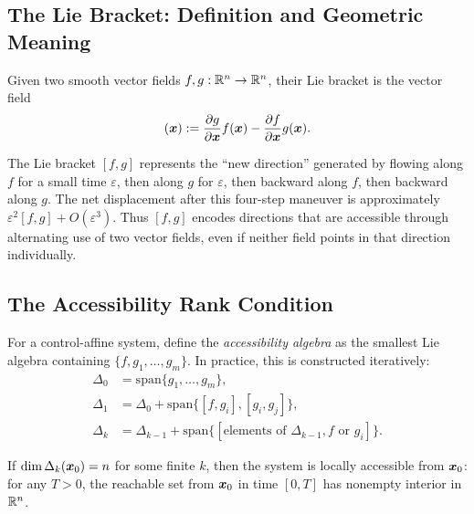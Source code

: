 \subsection{The Lie Bracket: Definition and Geometric Meaning}

\begin{definition}
\label{def:ch3:lie-bracket}
Given two smooth vector fields $f, g: \mathbb{R}^n \to \mathbb{R}^n$, their Lie bracket is the vector field
\begin{equation}
[f, g](\x) := \frac{\partial g}{\partial \x} f(\x) - \frac{\partial f}{\partial \x} g(\x).
\label{eq:ch3:lie-bracket}
\end{equation}
\end{definition}

\begin{intuitionbox}
The Lie bracket $[f, g]$ represents the ``new direction'' generated by flowing along $f$
for a small time $\varepsilon$, then along $g$ for $\varepsilon$, then backward along $f$,
then backward along $g$. The net displacement after this four-step maneuver is approximately
$\varepsilon^2 [f, g] + O(\varepsilon^3)$. Thus $[f, g]$ encodes directions that are
accessible through alternating use of two vector fields, even if neither field points in
that direction individually.
\end{intuitionbox}

\subsection{The Accessibility Rank Condition}

For a control-affine system, define the \emph{accessibility algebra} as the smallest
Lie algebra containing $\{f, g_1, \ldots, g_m\}$. In practice, this is constructed
iteratively:
\begin{align}
\Delta_0 &= \text{span}\{g_1, \ldots, g_m\}, \\
\Delta_1 &= \Delta_0 + \text{span}\{[f, g_i], [g_i, g_j]\}, \\
\Delta_k &= \Delta_{k-1} + \text{span}\{[\text{elements of } \Delta_{k-1}, f \text{ or } g_i]\}.
\end{align}

\begin{theorem}
\label{thm:ch3:chow}
If $\dim \Delta_k(\bm{x}_0) = n$ for some finite $k$, then the system is locally accessible
from $\bm{x}_0$: for any $T > 0$, the reachable set from $\bm{x}_0$ in time $[0, T]$ has
nonempty interior in $\mathbb{R}^n$.
\end{theorem}

